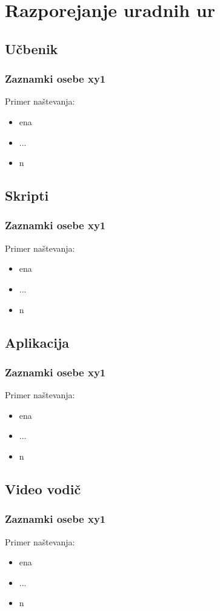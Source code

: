 \chapter{Razporejanje uradnih ur} \label{chapEN22}

\section{Učbenik}
\subsection{Zaznamki osebe xy1}
Primer naštevanja:
\begin{itemize}
	\item ena
	\item ...
	\item n	
\end{itemize}

\section{Skripti}
\subsection{Zaznamki osebe xy1}
Primer naštevanja:
\begin{itemize}
	\item ena
	\item ...
	\item n	
\end{itemize}

\section{Aplikacija}
\subsection{Zaznamki osebe xy1}
Primer naštevanja:
\begin{itemize}
	\item ena
	\item ...
	\item n	
\end{itemize}

\section{Video vodič}
\subsection{Zaznamki osebe xy1}
Primer naštevanja:
\begin{itemize}
	\item ena
	\item ...
	\item n	
\end{itemize}